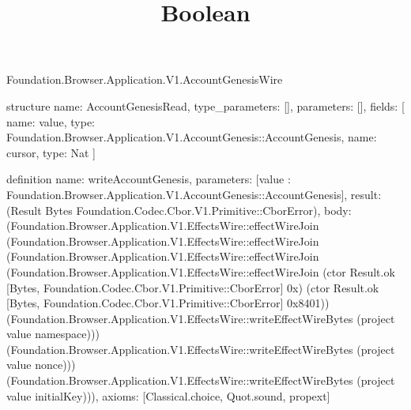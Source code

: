 \begin{lexlean}{Foundation.Browser.Application.V1.AccountGenesisWire}
\title{Boolean}
\begin{semanticmodule}
structure{
  name: AccountGenesisRead,
  type_parameters: [],
  parameters: [],
  fields: [
    {name: value, type: Foundation.Browser.Application.V1.AccountGenesis::AccountGenesis},
    {name: cursor, type: Nat}
  ]
}

definition{
  name: writeAccountGenesis,
  parameters: [value : Foundation.Browser.Application.V1.AccountGenesis::AccountGenesis],
  result: (Result Bytes Foundation.Codec.Cbor.V1.Primitive::CborError),
  body: (Foundation.Browser.Application.V1.EffectsWire::effectWireJoin (Foundation.Browser.Application.V1.EffectsWire::effectWireJoin (Foundation.Browser.Application.V1.EffectsWire::effectWireJoin (Foundation.Browser.Application.V1.EffectsWire::effectWireJoin (ctor Result.ok [Bytes, Foundation.Codec.Cbor.V1.Primitive::CborError] 0x) (ctor Result.ok [Bytes, Foundation.Codec.Cbor.V1.Primitive::CborError] 0x8401)) (Foundation.Browser.Application.V1.EffectsWire::writeEffectWireBytes (project value namespace))) (Foundation.Browser.Application.V1.EffectsWire::writeEffectWireBytes (project value nonce))) (Foundation.Browser.Application.V1.EffectsWire::writeEffectWireBytes (project value initialKey))),
  axioms: [Classical.choice, Quot.sound, propext]
}


\end{semanticmodule}
\end{lexlean}
